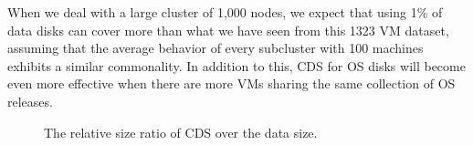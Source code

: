 When we deal with a large cluster of 1,000 nodes, we expect that using
1\% of data disks can cover more than what we have seen from this
1323 VM dataset, assuming that the average behavior of every subcluster with 100 machines
exhibits a similar commonality. 
In addition to this, CDS for OS disks will become even more effective when
there are more VMs sharing the same collection of OS releases. 

\begin{figure}
  \centering
  \caption{The relative size ratio of  CDS over the data size. }
  \label{fig:datacds}
\end{figure}

